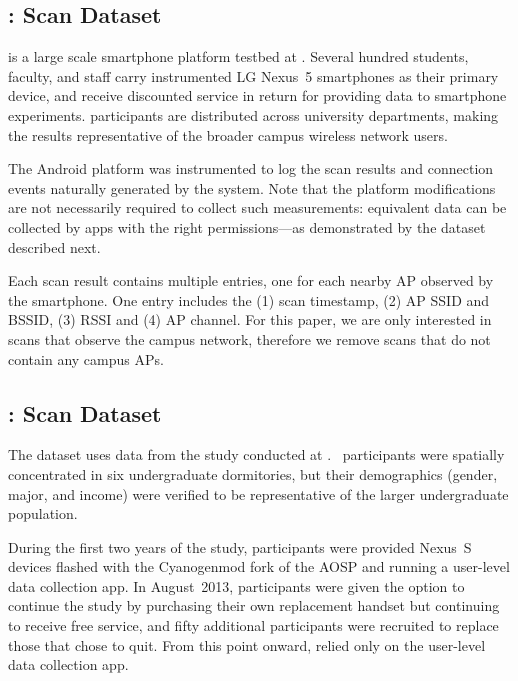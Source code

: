 \subsection{\ubscan{}: \PhoneLab{} \wifi{} Scan Dataset}
\label{sec:phonelab}

\PhoneLab{} is a large scale smartphone platform testbed at \ub{}. Several
hundred students, faculty, and staff carry instrumented LG Nexus~5 smartphones
as their primary device, and receive discounted service in return for providing
data to smartphone experiments. \PhoneLab{} participants are distributed across
university departments, making the results representative of the broader campus
wireless network users.

The \PhoneLab{} Android platform was instrumented to log the \wifi{} scan
results and \wifi{} connection events naturally generated by the system.
Note that the platform modifications are not necessarily required to collect such
measurements: equivalent data can be collected by apps with the right
permissions---as demonstrated by the \ndscan{} dataset described next.

Each scan result contains multiple entries, one for each nearby
\wifi{} AP observed by the smartphone. One entry includes the
(1) scan timestamp, (2) AP SSID and BSSID, (3) RSSI and (4) AP channel. For
this paper, we are only interested in scans that observe the \ub{} campus
network, therefore we remove scans that do not contain any \ub{} campus APs.


\subsection{\ndscan{}: \NetSense{} \wifi{} Scan Dataset}
\label{sec:netsense}

The \ndscan{} dataset uses data from the \NetSense{} study
conducted at \nd{}.
\NetSense{}~participants were spatially concentrated in six undergraduate
dormitories, but their demographics (gender, major, and income) were verified
to be representative of the larger undergraduate population.

During the first two years of the study, \NetSense{} participants were
provided Nexus~S devices flashed with the Cyanogenmod fork of the AOSP and
running a user-level data collection app. In August~2013, participants were
given the option to continue the study by purchasing their own replacement
handset but continuing to receive free service, and fifty additional
participants were recruited to replace those that chose to quit. From this
point onward, \NetSense{} relied only on the user-level data collection app.

